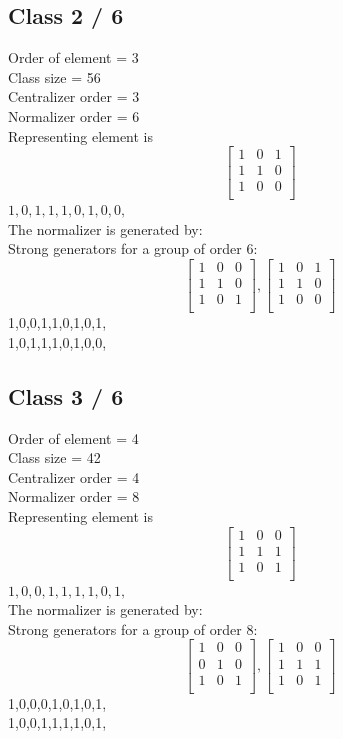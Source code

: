 \subsection*{Class 2 / 6}
Order of element = 3\\
Class size = 56\\
Centralizer order = 3\\
Normalizer order = 6\\
Representing element is
$$
\left[
\begin{array}{*{3}{r}}
1 & 0 & 1\\
1 & 1 & 0\\
1 & 0 & 0\\
\end{array}
\right]
$$
$1,0,1,1,1,0,1,0,0,$\\
The normalizer is generated by:\\
Strong generators for a group of order 6:
$$
\left[
\begin{array}{*{3}{r}}
1 & 0 & 0\\
1 & 1 & 0\\
1 & 0 & 1\\
\end{array}
\right]
, 
\left[
\begin{array}{*{3}{r}}
1 & 0 & 1\\
1 & 1 & 0\\
1 & 0 & 0\\
\end{array}
\right]
$$
1,0,0,1,1,0,1,0,1,\\
1,0,1,1,1,0,1,0,0,\\
\bigskip
\subsection*{Class 3 / 6}
Order of element = 4\\
Class size = 42\\
Centralizer order = 4\\
Normalizer order = 8\\
Representing element is
$$
\left[
\begin{array}{*{3}{r}}
1 & 0 & 0\\
1 & 1 & 1\\
1 & 0 & 1\\
\end{array}
\right]
$$
$1,0,0,1,1,1,1,0,1,$\\
The normalizer is generated by:\\
Strong generators for a group of order 8:
$$
\left[
\begin{array}{*{3}{r}}
1 & 0 & 0\\
0 & 1 & 0\\
1 & 0 & 1\\
\end{array}
\right]
, 
\left[
\begin{array}{*{3}{r}}
1 & 0 & 0\\
1 & 1 & 1\\
1 & 0 & 1\\
\end{array}
\right]
$$
1,0,0,0,1,0,1,0,1,\\
1,0,0,1,1,1,1,0,1,\\
\bigskip
